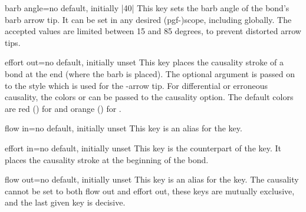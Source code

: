         \begin{xbgkey}{barb angle}{=}{no default, initially |40|}
            This key sets the barb angle of the bond's barb arrow tip. It can be set in any desired (pgf-)scope, including globally. The accepted values are limited between 15 and 85 degrees, to prevent distorted arrow tips.
        \end{xbgkey}
        
        \begin{xbgkey}{effort out}{=}{no default, initially unset}
            This key places the causality stroke of a bond at the end (where the barb is placed). The optional argument is passed on to the  style which is used for the \textbar-arrow tip. For differential or erroneous causality, the colors  or  can be passed to the causality option. The default colors are red () for  and orange () for .
        \end{xbgkey}
        
        \begin{xbgkey}{flow in}{=}{no default, initially unset}
            This key is an alias for the  key.
        \end{xbgkey}
        
        \begin{xbgkey}{effort in}{=}{no default, initially unset}
            This key is the counterpart of the  key. It places the causality stroke at the beginning of the bond.
        \end{xbgkey}
        
        \begin{xbgkey}{flow out}{=}{no default, initially unset}
            This key is an alias for the  key. The causality cannot be set to both flow out and effort out, these keys are mutually exclusive, and the last given key is decisive.
        \end{xbgkey}
        
